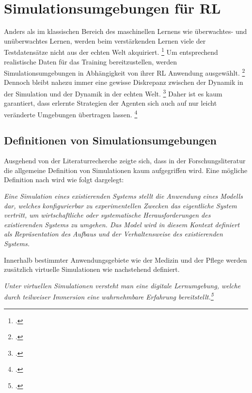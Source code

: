 \section{Simulationsumgebungen für RL}

Anders als im klassischen Bereich des maschinellen Lernens wie überwachtes- und unüberwachtes Lernen, werden beim verstärkenden Lernen viele der Testdatensätze nicht aus der echten Welt akquiriert. \footcite[Vgl.][S. 1]{Zhang.2018}
Um entsprechend realistische Daten für das Training bereitzustellen, werden Simulationsumgebungen in Abhängigkeit von ihrer RL Anwendung ausgewählt. \footcite[Vgl.][S. 7]{Korber.2021}
Dennoch bleibt nahezu immer eine gewisse Diskrepanz zwischen der Dynamik in der Simulation und der Dynamik in der echten Welt. \footcite[Vgl.][S. 1]{Bharadhwaj.2019}
Daher ist es kaum garantiert, dass erlernte Strategien der Agenten sich auch auf nur leicht veränderte Umgebungen übertragen lassen. \footcite[Vgl.][S. 1]{Bharadhwaj.2019}

\subsection{Definitionen von Simulationsumgebungen}
Ausgehend von der Literaturrecherche zeigte sich, dass in der Forschungsliteratur die allgemeine Definition von Simulationen kaum aufgegriffen wird.
Eine mögliche Definition nach \cite[]{Maria.1997} wird wie folgt dargelegt:

\textit{Eine Simulation eines existierenden Systems stellt die Anwendung eines Modells dar, welches konfigurierbar zu experimentellen Zwecken das eigentliche System vertritt, um wirtschaftliche oder systematische Herausforderungen des existierenden Systems zu umgehen.
Das Model wird in diesem Kontext definiert als Repräsentation des Aufbaus und der Verhaltensweise des existierenden Systems.}

Innerhalb bestimmter Anwendungsgebiete wie der Medizin und der Pflege werden zusätzlich virtuelle Simulationen wie nachstehend definiert.

\textit{Unter virtuellen Simulationen versteht man eine digitale Lernumgebung, welche durch teilweiser Immersion eine wahrnehmbare Erfahrung bereitstellt.\footcite[Vgl.][S. 1]{Foronda.2021}}

